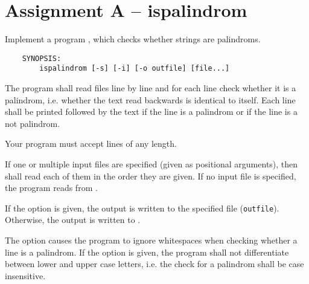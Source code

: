 




\section*{Assignment A -- ispalindrom}

Implement a program ,
which checks whether strings are palindroms.

\begin{verbatim}
    SYNOPSIS:
        ispalindrom [-s] [-i] [-o outfile] [file...]
\end{verbatim}

The program  shall read files line by line
and for each line check whether it is a palindrom,
i.e. whether the text read backwards is identical to itself.
Each line shall be printed followed by the text
 if the line is a palindrom
or  if the line is a not palindrom.

Your program must accept lines of any length.

If one or multiple input files are specified (given as positional arguments),
then  shall read each of them in the order they are given.
If no input file is specified, the program reads from .

If the option  is given,
the output is written to the specified file (\verb|outfile|).
Otherwise, the output is written to .

The option  causes the program to ignore whitespaces
when checking whether a line is a palindrom.
If the option  is given,
the program shall not differentiate between lower and upper case letters,
i.e. the check for a palindrom shall be case insensitive.

